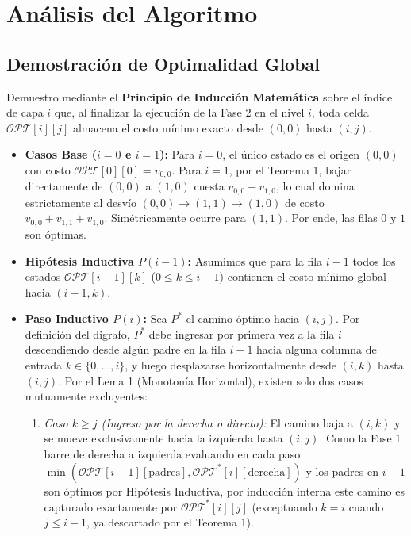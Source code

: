 \section{Análisis del Algoritmo}

\subsection{Demostración de Optimalidad Global}

Demuestro mediante el \textbf{Principio de Inducción Matemática} sobre el índice de capa $i$ que, al finalizar la ejecución de la Fase 2 en el nivel $i$, toda celda $\mathcal{OPT}[i][j]$ almacena el costo mínimo exacto desde $(0,0)$ hasta $(i,j)$.

\begin{itemize}
    \item \textbf{Casos Base ($i = 0$ e $i = 1$):} Para $i = 0$, el único estado es el origen $(0,0)$ con costo $\mathcal{OPT}[0][0] = v_{0,0}$. Para $i = 1$, por el Teorema 1, bajar directamente de $(0,0)$ a $(1,0)$ cuesta $v_{0,0} + v_{1,0}$, lo cual domina estrictamente al desvío $(0,0) \to (1,1) \to (1,0)$ de costo $v_{0,0} + v_{1,1} + v_{1,0}$. Simétricamente ocurre para $(1,1)$. Por ende, las filas $0$ y $1$ son óptimas.
    \item \textbf{Hipótesis Inductiva $P(i-1)$:} Asumimos que para la fila $i-1$ todos los estados $\mathcal{OPT}[i-1][k]$ ($0 \leq k \leq i-1$) contienen el costo mínimo global hacia $(i-1, k)$.
    \item \textbf{Paso Inductivo $P(i)$:} Sea $P^*$ el camino óptimo hacia $(i, j)$. Por definición del digrafo, $P^*$ debe ingresar por primera vez a la fila $i$ descendiendo desde algún padre en la fila $i-1$ hacia alguna columna de entrada $k \in \{0, \dots, i\}$, y luego desplazarse horizontalmente desde $(i, k)$ hasta $(i, j)$. Por el Lema 1 (Monotonía Horizontal), existen solo dos casos mutuamente excluyentes:
    \begin{enumerate}
        \item \textit{Caso $k \geq j$ (Ingreso por la derecha o directo):} El camino baja a $(i, k)$ y se mueve exclusivamente hacia la izquierda hasta $(i, j)$. Como la Fase 1 barre de derecha a izquierda evaluando en cada paso $\min(\mathcal{OPT}[i-1][\text{padres}], \mathcal{OPT}^*[i][\text{derecha}])$ y los padres en $i-1$ son óptimos por Hipótesis Inductiva, por inducción interna este camino es capturado exactamente por $\mathcal{OPT}^*[i][j]$ (exceptuando $k=i$ cuando $j \leq i-1$, ya descartado por el Teorema 1).

\end{enumerate}
\end{itemize}
